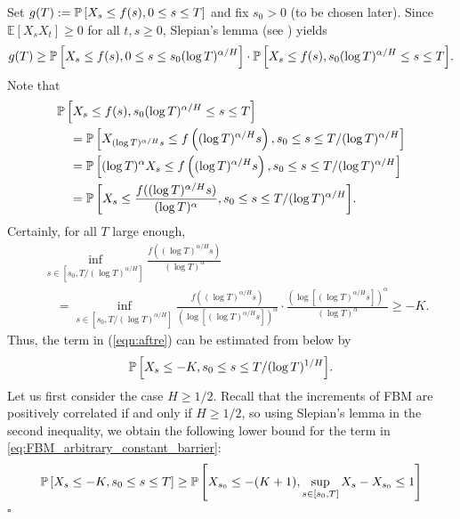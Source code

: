 \documentclass[11pt]{article}
\theoremstyle{plain}
\theoremstyle{definition}
\renewenvironment{proof}[1][] {\smallskip \noindent {\bf Proof#1.} }{\hspace*{\fill}$\square$\medskip\par}
\begin{document}
\begin{proof}
   Set $g(T):= {{{\bf {\mathbb{P}}}}\left[{X_s\leq f(s), 0 \leq  s\leq T}\right]}$ and fix $s_0>0$ (to be chosen later). Since ${\mathbb{E}\left[{X_s X_t}\right]}\geq 0$ for all $t,s\geq 0$, Slepian's lemma (see \cite{slepian:1962}) yields
\begin{align*}
g(T)\geq {{{\bf {\mathbb{P}}}}\left[{X_s\leq f(s), 0\leq s\leq s_0 (\log T)^{\alpha/H}}\right]} \cdot {{{\bf {\mathbb{P}}}}\left[{X_s\leq f(s), s_0 (\log T)^{\alpha/H} \leq s \leq T}\right]}.
\end{align*}
Note that
\begin{align}
 & {{{\bf {\mathbb{P}}}}\left[{X_s \leq f(s), s_0 ( \log T)^{\alpha/H} \leq s \leq T}\right]}  \notag \\ \notag
&\quad = {{{\bf {\mathbb{P}}}}\left[{ X_{(\log T)^{\alpha / H} s}\leq f\left((\log T)^{\alpha / H} s\right), s_0 \leq s \leq T/(\log T)^{\alpha/H}}\right]} \\  \notag
&\quad ={{{\bf {\mathbb{P}}}}\left[{ (\log T)^\alpha X_{s} \leq f\left((\log T)^{\alpha/H} s\right), s_0 \leq s \leq T/(\log T)^{\alpha/H}}\right]}\\ 
&\quad ={{{\bf {\mathbb{P}}}}\left[{ X_{s}\leq \frac{f((\log T)^{\alpha/H} s) }{(\log T)^\alpha}, s_0 \leq s \leq T/(\log T)^{\alpha/H}}\right]}. \label{eqn:aftre}
\end{align}
Certainly, for all $T$ large enough, 
\begin{align*}
&\inf_{s \in [s_0, T / (\log T)^{\alpha/H}]} \frac{f((\log T)^{\alpha/H} s) }{(\log T)^\alpha} \\
&\quad = \inf_{s \in [s_0, T / (\log T)^{\alpha/H}]} \frac{f((\log T)^{\alpha/H} s) }{(\log [( \log T)^{\alpha/H} s ] )^\alpha} \cdot \frac{( \log [( \log T)^{\alpha/H} s ] )^\alpha}{(\log T)^\alpha} \ge -K.
\end{align*}
Thus, the term in (\ref{eqn:aftre}) can be estimated from below by
\begin{equation}\label{eq:FBM_arbitrary_constant_barrier}
   {{{\bf {\mathbb{P}}}}\left[{ X_{s}\leq -K, s_0 \leq s \leq T/(\log T)^{1/H}}\right]}.
\end{equation}
Let us first consider the case $H \ge 1/2$. Recall that the increments of FBM are positively correlated if and only if $H \ge 1/2$, so using Slepian's lemma in the second inequality, we obtain the following lower bound for the term in \eqref{eq:FBM_arbitrary_constant_barrier}:
\begin{align*}
   {{{\bf {\mathbb{P}}}}\left[{X_s \le -K, s_0 \le s \le T}\right]} &\ge {{{\bf {\mathbb{P}}}}\left[{X_{s_0} \le -(K+1), \sup_{s \in [s_0,T]} X_s - X_{s_0} \le 1}\right]} \\

\end{align*}
\end{proof}
\end{document}

